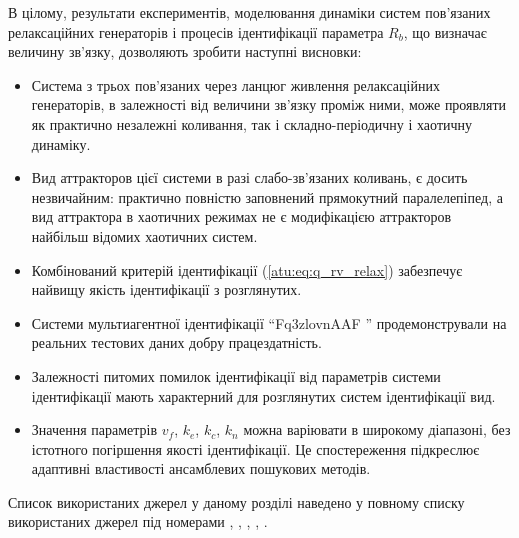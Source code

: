 В цілому, результати експериментів, моделювання динаміки систем
пов'язаних релаксаційних генераторів і процесів ідентифікації
параметра
$ R_b $, що визначає величину зв'язку, дозволяють зробити
наступні висновки:

\begin{itemize}

  \item
    Система з трьох пов'язаних через ланцюг живлення релаксаційних
    генераторів, в залежності від величини зв'язку проміж ними,
    може проявляти як практично незалежні коливання, так і
    складно-періодичну і хаотичну динаміку.


  \item
    Вид аттракторов цієї системи в разі слабо-зв'язаних коливань, є
    досить незвичайним: практично повністю заповнений прямокутний
    паралелепіпед, а вид аттрактора в хаотичних режимах не є
    модифікацією аттракторов найбільш відомих хаотичних систем.


  \item
    Комбінований критерій ідентифікації (\ref{atu:eq:q_rv_relax}) забезпечує
    найвищу якість ідентифікації з розглянутих.

  \item
    Системи мультиагентної ідентифікації ``Fq3zlovnAAF ''
    продемонстрували на реальних тестових даних добру
    працездатність.

  \item
    Залежності питомих помилок ідентифікації від параметрів
    системи ідентифікації мають характерний для розглянутих систем
    ідентифікації вид.

  \item
    Значення параметрів
    $ v_f $,
    $ k_e $,
    $ k_c $,
    $ k_n $ можна варіювати в широкому діапазоні, без істотного
    погіршення якості ідентифікації. Це спостереження підкреслює
    адаптивні властивості ансамблевих пошукових методів.

\end{itemize}


Список використаних джерел у даному розділі наведено у повному
списку використаних джерел під номерами
\cite{horowitz},
\cite{atu_st104b},
\cite{atu_asau19},
\cite{kennedy1999},
\cite{atu_st107}.


